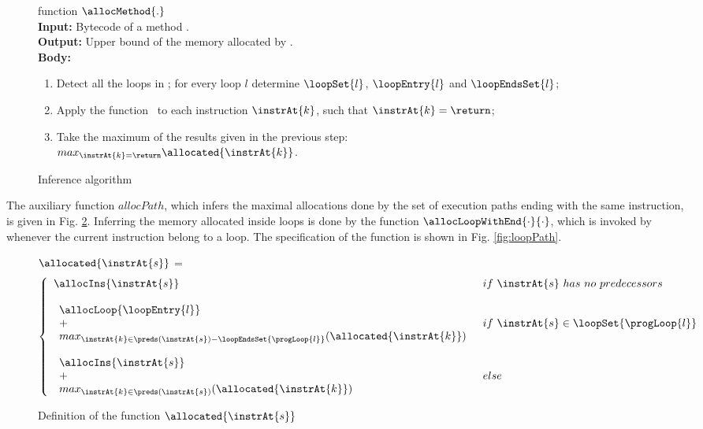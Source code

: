 \begin{figure}[!htp]
\begin{frameit}
function $\allocMethod{.}$\\
\textbf{Input:} Bytecode of a method \methodd{} . \\
\textbf{Output:} Upper bound of the memory allocated by \methodd{} . \\
\textbf{Body:}
\begin{enumerate}
   \item Detect all the loops in \methodd{}; for every loop $l$ determine $\loopSet{l}$, $\loopEntry{l}$ and $\loopEndsSet{l}$;
   \item Apply the function \allocatedOnly \  to each instruction $\instrAt{k}$, such that $\instrAt{k} = \return$;
   \item Take the maximum of the results given in the previous step: \\
 $max_{\instrAt{k} = \return } \allocated{\instrAt{k}}$.
\end{enumerate}
\caption{\sc Inference algorithm}
\label{methodAlloc}
\end{frameit}
\end{figure}
The auxiliary function $allocPath$, which infers the maximal allocations done by the set of execution paths ending with the same \return{} instruction,
 is given in Fig. \ref{fig:allocMethod}.
Inferring the memory allocated inside loops is done by the function $\allocLoopWithEnd{\cdot}{\cdot}$, which is invoked by \allocatedOnly{} whenever the 
current instruction belong to a loop. The specification of the function is shown in Fig. \ref{fig:loopPath}.

\begin{figure}[!hbp]
\begin{frameit}
$\allocated{\instrAt{s}}$ = 
$$ \left\{ \begin{array}{ll}
\allocIns{\instrAt{s} }   &  if \ \instrAt{s} \ has \ no \ predecessors \\
& \\
  \begin{array}{l}
            \allocLoop{\loopEntry{l}} \\
             + \\
            max_{\instrAt{k} \in \preds(\instrAt{s} )-\loopEndsSet{\progLoop{l}}}( \allocated{\instrAt{k}} ) \\
                   \end{array}      & if \  \instrAt{s} \in \loopSet{\progLoop{l}} \\
& \\
\begin{array}{l}
\allocIns{\instrAt{s}} \\
 + \\
max_{\instrAt{k} \in \preds(\instrAt{s} )}
 ( \allocated{\instrAt{k}} )
                       \end{array} & else 
\end{array}
\right.
$$
\caption{\sc Definition of the function $\allocated{\instrAt{s}}$} 
\label{fig:allocMethod}
\end{frameit}
\end{figure}


